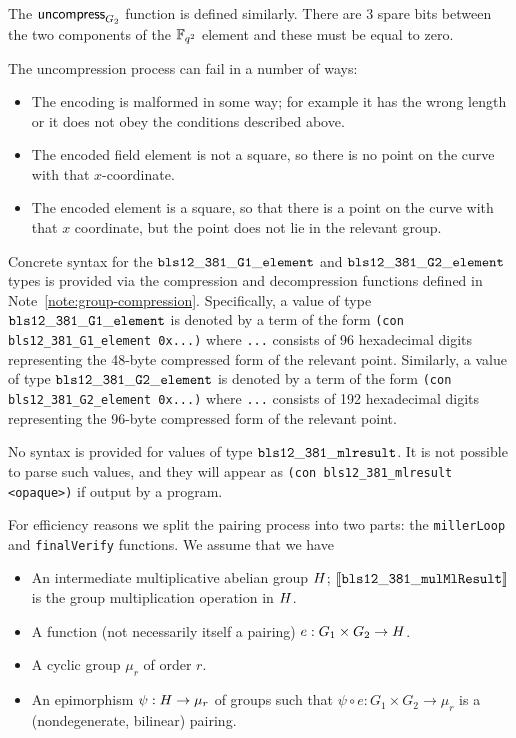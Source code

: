 \medskip
\noindent The $\mathsf{uncompress}_{G_2}$ function is defined similarly. There are 3 spare bits
between the two components of the $\mathbb{F}_{q^2}$ element and these must be equal to zero.

\medskip\noindent The uncompression process can fail in a number of ways:
\begin{itemize}
\item The encoding is malformed in some way; for example it has the wrong length or it does
not obey the conditions described above.
\item The encoded field element is not a square, so there is no point on the curve with that $x$-coordinate.
\item The encoded element is a square,  so that there is a point on the curve with that $x$ coordinate,
but the point does not lie in the relevant group.
\end{itemize}

\label{note:bls-syntax}
Concrete syntax for the $\mathtt{bls12\_381\_G1\_element}$ and
$\mathtt{bls12\_381\_G2\_element}$ types is provided via the compression and
decompression functions defined in Note~\ref{note:group-compression}.  Specifically, a
value of type $\mathtt{bls12\_381\_G1\_element}$ is denoted by a term of the
form \texttt{(con bls12\_381\_G1\_element 0x...)} where \texttt{...} consists of
96 hexadecimal digits representing the 48-byte compressed form of the relevant
point.  Similarly, a value of type $\mathtt{bls12\_381\_G2\_element}$ is denoted by
a term of the form \texttt{(con bls12\_381\_G2\_element 0x...)}
where \texttt{...} consists of 192 hexadecimal digits representing the 96-byte
compressed form of the relevant point.

No syntax is provided for values of type $\mathtt{bls12\_381\_mlresult}$. It is not
possible to parse such values, and they will appear as \texttt{(con
bls12\_381\_mlresult <opaque>)} if output by a program.


\label{note:pairing}
For efficiency reasons we split the pairing process into two parts:
the \texttt{millerLoop} and \texttt{finalVerify} functions.  We assume that we
have
\begin{itemize}
\item An intermediate multiplicative abelian group $H$;
$\llbracket\mathit{\mathtt{bls12\_381\_mulMlResult}}\rrbracket$
is the group multiplication operation in $H$.
\item A function (not necessarily itself a pairing) $e: G_1 \times
G_2 \rightarrow H$.
\item A cyclic group $\mu_r$ of order $r$.
\item An epimorphism $\psi: H \rightarrow \mu_r$ of groups such
that $\psi \circ e: G_1 \times G_2 \rightarrow \mu_r$ is a (nondegenerate,
bilinear) pairing.
\end{itemize}

